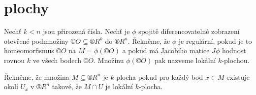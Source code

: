 \documentclass[12pt]{article}                   %
\begin{document}
\section{plochy}
    \begin{definice}
        Nechť $k < n$ jsou přirozená čísla. Nechť je $\phi$ spojitě diferencovatelné zobrazení otevřené podmnožiny $©O \subseteq ®R^k$ do $®R^n$. Řekněme, že $\phi$ je regulární, pokud je to homeomorfismus $©O$ na $M = \phi(©O)$ a pokud má Jacobiho matice $J\phi$ hodnost rovnou $k$ ve všech bodech $©O$. Množinu $\phi(©O)$ pak nazveme lokální $k$-plochou.

        Řekněme, že množina $M \subseteq ®R^n$ je $k$-plocha pokud pro každý bod $x \in M$ existuje okolí $U_x$ v $®R^n$ takové, že $M \cap U$ je lokální $k$-plocha.
    \end{definice}
\end{document}
